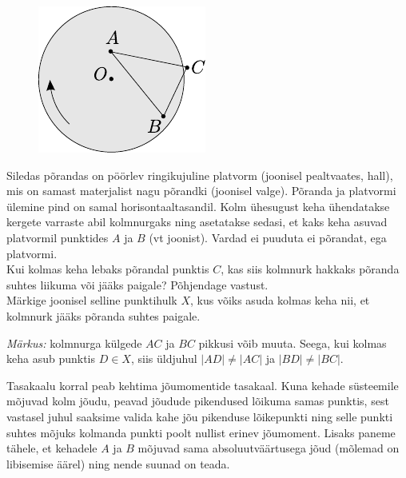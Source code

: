 
\begin{figure}
	\begin{center}
		\vspace{-20pt}
		\includegraphics[width=\linewidth]{2005-v3g-10-yl}
	\end{center}
\end{figure}
Siledas põrandas on pöörlev ringikujuline platvorm (joonisel pealtvaates, hall), mis on samast materjalist nagu põrandki (joonisel valge). Põranda ja platvormi ülemine pind on samal horisontaaltasandil. Kolm ühesugust keha ühendatakse kergete varraste abil kolmnurgaks ning asetatakse sedasi, et kaks keha asuvad platvormil punktides $A$ ja $B$ (vt joonist). Vardad ei puuduta ei põrandat, ega platvormi.\\
\osa Kui kolmas keha lebaks põrandal punktis $C$, kas siis kolmnurk hakkaks põranda suhtes liikuma või jääks paigale? Põhjendage vastust.\\
\osa Märkige joonisel selline punktihulk $X$, kus võiks asuda kolmas keha nii, et kolmnurk jääks põranda suhtes paigale.

\emph{Märkus:} kolmnurga külgede $AC$ ja $BC$ pikkusi võib muuta. Seega, kui kolmas keha asub punktis $D \in X$, siis üldjuhul $|AD| \neq |AC|$ ja $|BD| \neq |BC|$.

\hint
Tasakaalu korral peab kehtima jõumomentide tasakaal. Kuna kehade süsteemile mõjuvad kolm jõudu, peavad jõudude pikendused lõikuma samas punktis, sest vastasel juhul saaksime valida kahe jõu pikenduse lõikepunkti ning selle punkti suhtes mõjuks kolmanda punkti poolt nullist erinev jõumoment. Lisaks paneme tähele, et kehadele $A$ ja $B$ mõjuvad sama absoluutväärtusega jõud (mõlemad on libisemise äärel) ning nende suunad on teada.

